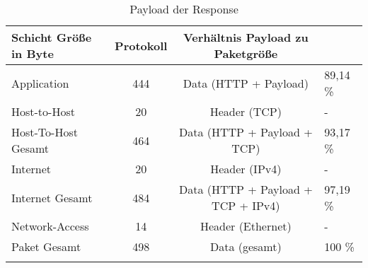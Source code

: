 \begin{longtable}{l|c|c|l}
    \hline
    Schicht
    Größe in Byte & Protokoll & Verhältnis Payload zu Paketgröße
    \\\hline
    Application & 444 & Data (HTTP + Payload) & 89,14 \%
    \\\hline
    Host-to-Host & 20 & Header (TCP) & -
    \\\hline
    Host-To-Host Gesamt & 464 & Data (HTTP + Payload + TCP) & 93,17 \%
    \\\hline
    Internet & 20 & Header (IPv4) & -
    \\\hline
    Internet Gesamt & 484 & Data (HTTP + Payload + TCP + IPv4) & 97,19 \%
    \\\hline
    Network-Access & 14 & Header (Ethernet) & -
    \\\hline
    Paket Gesamt & 498 & Data (gesamt) & 100 \%
    \\
    \caption{Payload der Response}
\end{longtable}